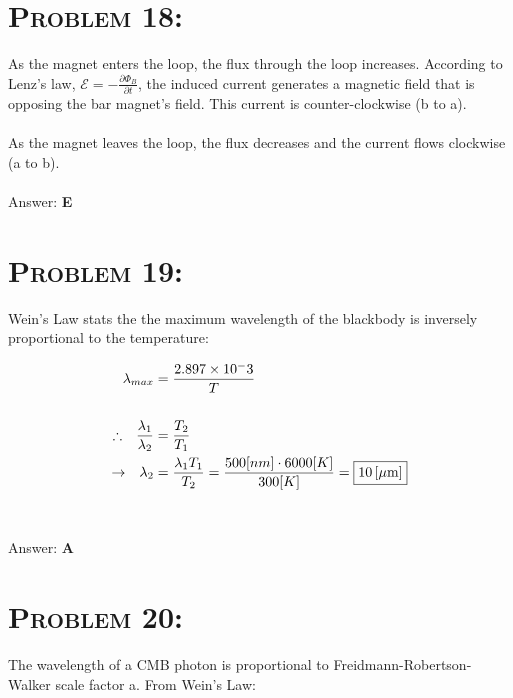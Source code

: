 \documentclass{article}
\providecommand{\e}[1]{\ensuremath{\times 10^{#1}}}
\begin{document}

\section{\textsc{Problem 18:}} As the magnet enters the loop, the flux through
the loop increases. According to Lenz's law, $\mathcal{E} = -\frac{\partial \Phi_B}{\partial t}$, the induced current generates a magnetic field that is opposing the bar magnet's field. This current is counter-clockwise (b to a).\\
\\
As the magnet leaves the loop, the flux decreases and the current flows clockwise (a to b).
\\\\
Answer: \textbf{\textcolor{ProcessBlue}E}\\


\section{\textsc{Problem 19:}} Wein's Law stats the the maximum wavelength of the blackbody is inversely proportional to the temperature:

\begin{align}
\lambda_{max}  &= \frac{2.897\e-3}{T}\\
\nonumber\\
\therefore \hspace{.1in} \frac{\lambda_{1}}{\lambda_{2}} &= \frac{T_2}{T_1}\nonumber \\
\rightarrow \hspace{.1in} \lambda_2 &= \frac{\lambda_1T_1}{T_2} =  \frac{500 [nm]\cdot 6000 [K]}{300 [K]} = \boxed{\unit[10] {[\mu m]}}\nonumber
\end{align}
\\\\
Answer: \textbf{\textcolor{ProcessBlue}A}\\


\section{\textsc{Problem 20:}} The wavelength of a CMB photon is proportional to Freidmann-Robertson-Walker scale factor a. From Wein's Law:
\end{document}
